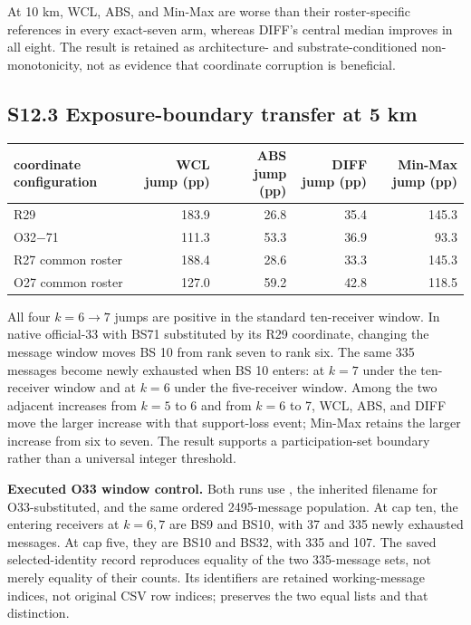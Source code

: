 \documentclass[journal,onecolumn,10pt]{IEEEtran}
\begin{document}
At 10 km, WCL, ABS, and Min-Max are worse than their roster-specific references in every exact-seven arm, whereas DIFF's central median improves in all eight. The result is retained as architecture- and substrate-conditioned non-monotonicity, not as evidence that coordinate corruption is beneficial.

\subsection*{S12.3 Exposure-boundary transfer at 5 km}

\begin{center}\begin{minipage}{\textwidth}\centering
{}

\begin{tabular}{@{}lrrrr@{}}
\toprule
coordinate configuration & WCL jump (pp) & ABS jump (pp) & DIFF jump (pp) & Min-Max jump (pp) \\
\midrule

R29 & 183.9 & 26.8 & 35.4 & 145.3 \\
O32$-$71 & 111.3 & 53.3 & 36.9 & 93.3 \\
R27 common roster & 188.4 & 28.6 & 33.3 & 145.3 \\
O27 common roster & 127.0 & 59.2 & 42.8 & 118.5 \\
\bottomrule
\end{tabular}
\end{minipage}\end{center}

All four $k=6\rightarrow7$ jumps are positive in the standard ten-receiver window. In native official-33 with BS71 substituted by its R29 coordinate, changing the message window moves BS 10 from rank seven to rank six. The same 335 messages become newly exhausted when BS 10 enters: at $k=7$ under the ten-receiver window and at $k=6$ under the five-receiver window. Among the two adjacent increases from $k=5$ to 6 and from $k=6$ to 7, WCL, ABS, and DIFF move the larger increase with that support-loss event; Min-Max retains the larger increase from six to seven. The result supports a participation-set boundary rather than a universal integer threshold.

\noindent\textbf{Executed O33 window control.} Both runs use , the inherited filename for O33-substituted, and the same ordered 2495-message population. At cap ten, the entering receivers at $k=6,7$ are BS9 and BS10, with 37 and 335 newly exhausted messages. At cap five, they are BS10 and BS32, with 335 and 107. The saved selected-identity record reproduces equality of the two 335-message sets, not merely equality of their counts. Its identifiers are retained working-message indices, not original CSV row indices;  preserves the two equal lists and that distinction.
\end{document}
